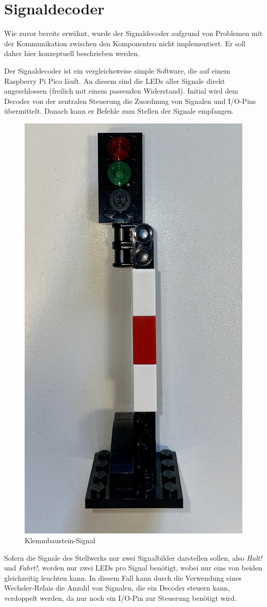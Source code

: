 \section{Signaldecoder}\label{text:Entwicklung-des-Stellwerks:Signaldecoder}

Wie zuvor bereits erwähnt, wurde der Signaldecoder aufgrund von Problemen mit der Kommunikation zwischen den Komponenten nicht implementiert. Er soll daher hier konzeptuell beschrieben werden.

Der Signaldecoder ist ein vergleichsweise simple Software, die auf einem Raspberry Pi Pico läuft. An diesem sind die LEDs aller Signale direkt angeschlossen (freilich mit einem passenden Widerstand). Initial wird dem Decoder von der zentralen Steuerung die Zuordnung von Signalen und I/O-Pins übermittelt. Danach kann er Befehle zum Stellen der Signale empfangen.

\begin{figure}[H]
    \centering
    \includegraphics[width=.4\textwidth]{Assets/Images/5-Entwicklung-des-Stellwerks/Signal.jpg}
    \caption{Klemmbaustein-Signal}\label{abb:Entwicklung-des-Stellwerks:Signal}
\end{figure}

Sofern die Signale des Stellwerks nur zwei Signalbilder darstellen sollen, also \textit{Halt!} und \textit{Fahrt!}, werden nur zwei LEDs pro Signal benötigt, wobei nur eins von beiden gleichzeitig leuchten kann. In diesem Fall kann durch die Verwendung eines Wechsler-Relais die Anzahl von Signalen, die ein Decoder steuern kann, verdoppelt werden, da nur noch ein I/O-Pin zur Steuerung benötigt wird.
